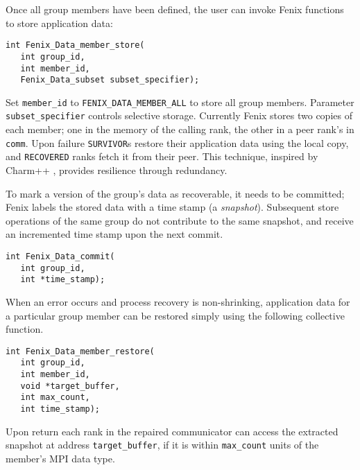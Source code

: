 Once all group members have been defined, the user can invoke Fenix functions to store
application data:
\begin{verbatim}
int Fenix_Data_member_store( 
   int group_id, 
   int member_id, 
   Fenix_Data_subset subset_specifier);
\end{verbatim}
Set \texttt{member\_id} to  \texttt{FENIX\_DATA\_MEMBER\_ALL}
to store all group members.
Parameter \texttt{subset\_specifier} controls selective storage.
Currently Fenix stores two copies of each member;
one in the memory of the calling rank, the other in a peer rank's in \texttt{comm}.
Upon failure \texttt{SURVIVOR}s restore their
application data using the local copy, and \texttt{RECOVERED} ranks 
fetch it from their peer. This technique, inspired by
Charm++ \cite{charm++}, provides resilience through redundancy.

To mark a version of the group's data as recoverable,
it needs to be committed; Fenix labels the stored data with a time
stamp (a \textit{snapshot}).
Subsequent store operations of the same  group do not contribute
to the same snapshot, and receive an incremented time stamp upon the next commit.
\begin{verbatim}
int Fenix_Data_commit(
   int group_id,
   int *time_stamp);
\end{verbatim}

When an error occurs and process recovery is non-shrinking, application data
for a particular group member can be restored simply using the following collective function.
\begin{verbatim}
int Fenix_Data_member_restore(
   int group_id, 
   int member_id,
   void *target_buffer, 
   int max_count, 
   int time_stamp);
\end{verbatim}
Upon return each rank in the repaired communicator can access the
extracted snapshot at address \texttt{target\_buffer}, if
it is within \texttt{max\_count} units of the member's MPI data type.

